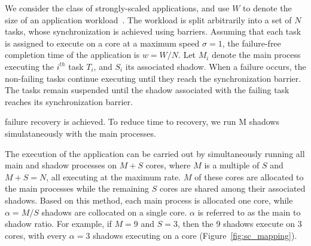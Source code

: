We consider the class of strongly-scaled applications, and use $W$ to denote the size of an application workload~\cite{doe_ascr_exascale_2011}. The workload is split  arbitrarily into a set of $N$ tasks, whose synchronization is achieved using barriers. Assuming that each task is assigned to execute on a core at a maximum speed $\sigma=1$, the failure-free completion time of the application is $w = W/N$. 
Let $M_i$ denote the main process executing the $i^{th}$ task $T_i$, and $S_i$ its associated shadow.
When a failure occurs, the non-failing tasks continue executing until they reach the synchronization barrier. The tasks remain suspended until the shadow associated with the failing task reaches its synchronization barrier.


failure recovery is achieved.  To reduce time to recovery,  we run M shadows simulataneously with the main processes. 

 The execution of the application can be carried out by simultaneously running all main and shadow processes 
on %
$M+S$ cores, where $M$ is a multiple of $S$ and $M+S=N$, all executing at the maximum rate. $M$ of these cores are allocated to the main processes while the remaining $S$ cores are shared among their associated shadows. Based on this method, each main process is allocated one core, while $\alpha=M/S$ shadows are collocated on a single core. $\alpha$ is referred to as the main to shadow ratio.
For example, if $M=9$ and $S=3$, then the 9 shadows execute on 3 cores, with every $\alpha=3$ shadows executing on a core (Figure~\ref{fig:sc_mapping}).

